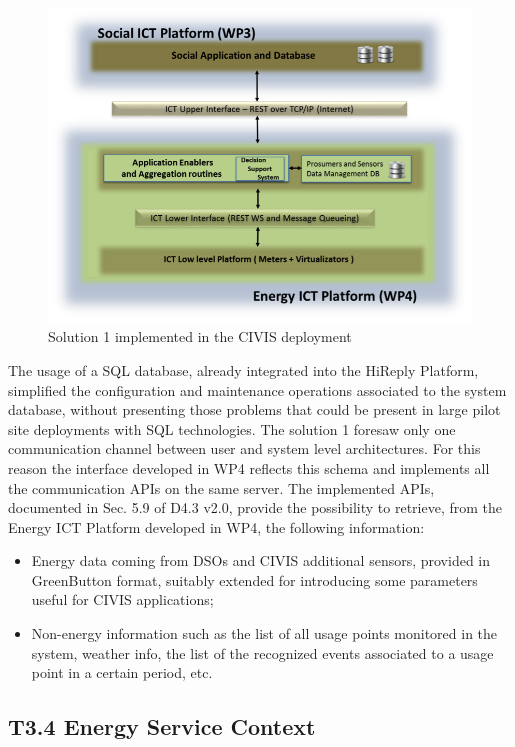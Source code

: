 \begin{figure}[h!]
\begin{center}
	\includegraphics[width=.85\textwidth]{img/wp4.png}
	\caption{Solution 1 implemented in the CIVIS deployment}\label{fig:wp4}
\end{center}
\end{figure}

The usage of a SQL database, already integrated into the HiReply Platform, simplified the configuration and maintenance operations associated to the system database, without presenting those problems that could be present in large pilot site deployments with SQL technologies.
The solution 1 foresaw only one communication channel between user and system level architectures. For this reason the interface developed in WP4 reflects this schema and implements all the communication APIs on the same server.
The implemented APIs, documented in Sec. 5.9 of D4.3 v2.0, provide the possibility to retrieve, from the Energy ICT Platform developed in WP4, the following information:

\begin{itemize}
\item Energy data coming from DSOs and CIVIS additional sensors, provided in GreenButton format, suitably extended for introducing some parameters useful for CIVIS applications;
\item Non-energy information such as the list of all usage points monitored in the system, weather info, the list of the recognized events associated to a usage point in a certain period, etc. 
\end{itemize}

\subsection{T3.4 Energy Service Context}

